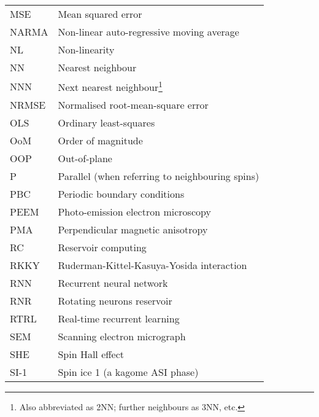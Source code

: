 {\begin{longtable}[l]{ll}
        MSE   & Mean squared error                          \\
        NARMA & Non-linear auto-regressive moving average   \\
        NL    & Non-linearity                               \\
        NN    & Nearest neighbour                           \\
        NNN   & Next nearest neighbour\footnote{Also abbreviated as 2NN; further neighbours as 3NN, etc.} \\
        NRMSE & Normalised root-mean-square error           \\
        OLS   & Ordinary least-squares                      \\
        OoM   & Order of magnitude                          \\
        OOP   & Out-of-plane                                \\
        P     & Parallel (when referring to neighbouring spins) \\
        PBC   & Periodic boundary conditions                \\
        PEEM  & Photo-emission electron microscopy          \\
        PMA   & Perpendicular magnetic anisotropy           \\
        RC    & Reservoir computing                         \\
        RKKY  & Ruderman-Kittel-Kasuya-Yosida interaction   \\
        RNN   & Recurrent neural network                    \\
        RNR   & Rotating neurons reservoir                  \\
        RTRL  & Real-time recurrent learning                \\
        SEM   & Scanning electron micrograph                \\
        SHE   & Spin Hall effect                            \\
        SI-1  & Spin ice 1 (a kagome ASI phase)             \\

\end{longtable}}
